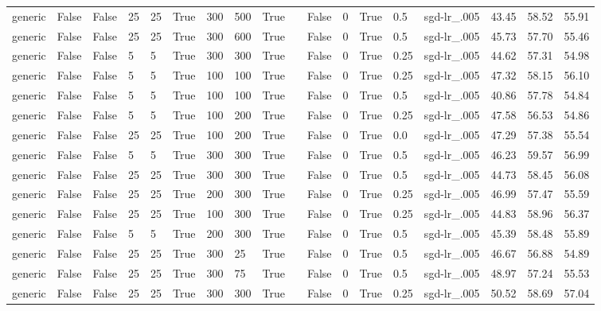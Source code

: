 \begin{adjustbox}{rotate=90,height=\textheight,width=\textwidth}
\begin{tabular}{llllllllllllllllll}
generic & False & False & 25 & 25 & True & 300 & 500 & True &  & False & 0 & True & 0.5 & sgd-lr\_.005 & 43.45 & 58.52 & 55.91\\
generic & False & False & 25 & 25 & True & 300 & 600 & True &  & False & 0 & True & 0.5 & sgd-lr\_.005 & 45.73 & 57.70 & 55.46\\
generic & False & False & 5 & 5 & True & 300 & 300 & True &  & False & 0 & True & 0.25 & sgd-lr\_.005 & 44.62 & 57.31 & 54.98\\
generic & False & False & 5 & 5 & True & 100 & 100 & True &  & False & 0 & True & 0.25 & sgd-lr\_.005 & 47.32 & 58.15 & 56.10\\
generic & False & False & 5 & 5 & True & 100 & 100 & True &  & False & 0 & True & 0.5 & sgd-lr\_.005 & 40.86 & 57.78 & 54.84\\
generic & False & False & 5 & 5 & True & 100 & 200 & True &  & False & 0 & True & 0.25 & sgd-lr\_.005 & 47.58 & 56.53 & 54.86\\
generic & False & False & 25 & 25 & True & 100 & 200 & True &  & False & 0 & True & 0.0 & sgd-lr\_.005 & 47.29 & 57.38 & 55.54\\
generic & False & False & 5 & 5 & True & 300 & 300 & True &  & False & 0 & True & 0.5 & sgd-lr\_.005 & 46.23 & 59.57 & 56.99\\
generic & False & False & 25 & 25 & True & 300 & 300 & True &  & False & 0 & True & 0.5 & sgd-lr\_.005 & 44.73 & 58.45 & 56.08\\
generic & False & False & 25 & 25 & True & 200 & 300 & True &  & False & 0 & True & 0.25 & sgd-lr\_.005 & 46.99 & 57.47 & 55.59\\
generic & False & False & 25 & 25 & True & 100 & 300 & True &  & False & 0 & True & 0.25 & sgd-lr\_.005 & 44.83 & 58.96 & 56.37\\
generic & False & False & 5 & 5 & True & 200 & 300 & True &  & False & 0 & True & 0.5 & sgd-lr\_.005 & 45.39 & 58.48 & 55.89\\
generic & False & False & 25 & 25 & True & 300 & 25 & True &  & False & 0 & True & 0.5 & sgd-lr\_.005 & 46.67 & 56.88 & 54.89\\
generic & False & False & 25 & 25 & True & 300 & 75 & True &  & False & 0 & True & 0.5 & sgd-lr\_.005 & 48.97 & 57.24 & 55.53\\
generic & False & False & 25 & 25 & True & 300 & 300 & True &  & False & 0 & True & 0.25 & sgd-lr\_.005 & 50.52 & 58.69 & 57.04
\end{tabular}
\end{adjustbox}
